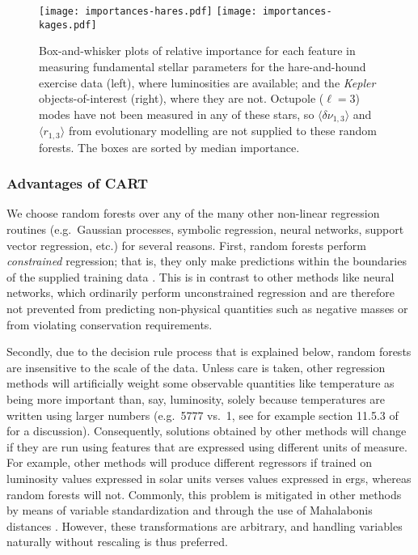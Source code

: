 \documentclass[manuscript,linenumbers]{aastex6}
\newif\ifref
\newcommand{\mb}[1]{\ifref\boldmath\textbf{#1}\unboldmath\else #1\fi}
\begin{document}
\begin{figure*}[!hbtp]
    \centering
    \texttt{[image: importances-hares.pdf]}\hfill
    \texttt{[image: importances-kages.pdf]}
    \caption{Box-and-whisker plots of relative importance for each feature in measuring fundamental stellar parameters for the hare-and-hound exercise data (left), where luminosities are available; and the \emph{Kepler} objects-of-interest (right), where they are not. Octupole ($\ell=3$) modes have not been measured in any of these stars, so $\langle\delta\nu_{1,3}\rangle$ and $\langle r_{1,3}\rangle$ from evolutionary modelling are not supplied to these random forests. The boxes are sorted by median importance.%
    \label{fig:importances2} }
\end{figure*}

\subsubsection{Advantages of CART}
We choose random forests over any of the many other non-linear regression routines (e.g.\ Gaussian processes, symbolic regression, neural networks, support vector regression, etc.) for several reasons. First, random forests perform \emph{constrained} regression; that is, they only make predictions within the boundaries of the supplied training data \citep[see e.g.][Section 9.2.1]{hastie2005elements}. This is in contrast to other methods like neural networks, which ordinarily perform unconstrained regression and are therefore not prevented from predicting non-physical quantities such as negative masses or from violating conservation requirements. 

Secondly, due to the decision rule process that is explained below, random forests are insensitive to the scale of the data. Unless care is taken, other regression methods will artificially weight some observable \mb{quantities} like temperature as being more important than, say, luminosity, solely because temperatures are written using larger numbers (e.g.\ 5777 vs.\ 1, see for example section 11.5.3 of \citealt{hastie2005elements} for a discussion). Consequently, solutions obtained by other methods will change if they are \mb{run using features that are} expressed using different units of measure. For example, other methods will produce different regressors if trained on luminosity values expressed in solar units verses values expressed in erg\mb{s}, whereas random forests will not. \mb{Commonly, this problem is mitigated in other methods by means of variable standardization and through the use of Mahalabonis distances \citep{mahalanobis1936generalized}. However, these transformations are arbitrary, and handling variables naturally without rescaling is thus preferred. } 
\end{document}
